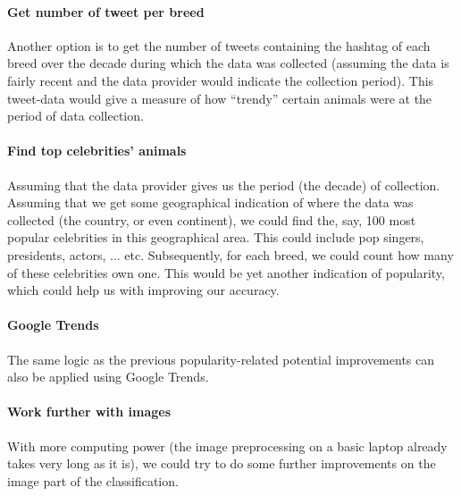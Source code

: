 \documentclass[12pt]{article}
\begin{document}
\paragraph{Get number of tweet per breed} Another option is to get the number of tweets containing the hashtag of each breed over the decade during which the data was collected (assuming the data is fairly recent and the data provider would indicate the collection period). This tweet-data would give a measure of how ``trendy'' certain animals were at the period of data collection.
\paragraph{Find top celebrities' animals} Assuming that the data provider gives us the period (\eg the decade) of collection. Assuming that we get some geographical indication of where the data was collected (\eg the country, or even continent), we could find the, say, 100 most popular celebrities in this geographical area. This could include pop singers, presidents, actors, ... etc. Subsequently, for each breed, we could count how many of these celebrities own one. This would be yet another indication of popularity, which could help us with improving our accuracy.
\paragraph{Google Trends} The same logic as the previous popularity-related potential improvements can also be applied using Google Trends.
\paragraph{Work further with images} With more computing power (the image preprocessing on a basic laptop already takes very long as it is), we could try to do some further improvements on the image part of the classification.

\clearpage

\printnoidxglossaries
\end{document}
